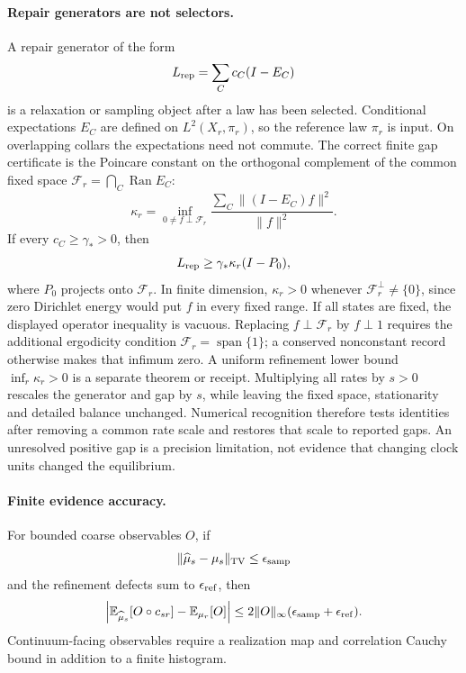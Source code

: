 \paragraph{Repair generators are not selectors.}
A repair generator of the form
\[
L_{\rm rep}=\sum_C c_C(I-E_C)
\]
is a relaxation or sampling object after a law has been selected.  Conditional expectations
\(E_C\) are defined on \(L^2(X_r,\pi_r)\), so the reference law \(\pi_r\) is input.  On
overlapping collars the expectations need not commute.  The correct finite gap certificate is the
Poincare constant on the orthogonal complement of the common fixed space
\(\mathcal F_r=\bigcap_C\operatorname{Ran}E_C\):
\[
\kappa_r
=
\inf_{0\ne f\perp\mathcal F_r}
\frac{\sum_C\|(I-E_C)f\|^2}{\|f\|^2}.
\]
If every \(c_C\ge\gamma_*>0\), then
\[
L_{\rm rep}\ge \gamma_*\kappa_r(I-P_0),
\]
where \(P_0\) projects onto \(\mathcal F_r\). In finite dimension,
\(\kappa_r>0\) whenever \(\mathcal F_r^\perp\ne\{0\}\), since zero
Dirichlet energy would put \(f\) in every fixed range. If all states are
fixed, the displayed operator inequality is vacuous. Replacing
\(f\perp\mathcal F_r\) by \(f\perp1\) requires the additional ergodicity
condition \(\mathcal F_r=\operatorname{span}\{1\}\); a conserved nonconstant
record otherwise makes that infimum zero. A uniform refinement lower
bound \(\inf_r\kappa_r>0\) is a separate theorem or receipt.
Multiplying all rates by \(s>0\) rescales the generator and gap by \(s\),
while leaving the fixed space, stationarity and detailed balance unchanged.
Numerical recognition therefore tests identities after removing a common
rate scale and restores that scale to reported gaps. An unresolved positive
gap is a precision limitation, not evidence that changing clock units
changed the equilibrium.

\paragraph{Finite evidence accuracy.}
For bounded coarse observables \(O\), if
\[
\|\widehat\mu_s-\mu_s\|_{\mathrm{TV}}\le\epsilon_{\rm samp}
\]
and the refinement defects sum to \(\epsilon_{\rm ref}\), then
\[
\left|\mathbb E_{\widehat\mu_s}[O\circ c_{sr}]-\mathbb E_{\mu_r}[O]\right|
\le
2\|O\|_\infty(\epsilon_{\rm samp}+\epsilon_{\rm ref}).
\]
Continuum-facing observables require a realization map and correlation Cauchy bound in addition to a
finite histogram.

